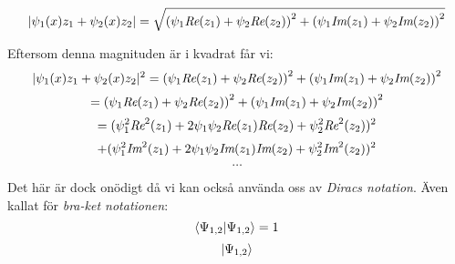 \documentclass{article}
\begin{document}
$$
|\psi_1(x)z_1 + \psi_2(x)z_2| = \sqrt{ \left( \psi_1 \emph{Re}(z_1) + \psi_2 \emph{Re}(z_2) \right)^2 + \left( \psi_1 \emph{Im}(z_1) + \psi_2 \emph{Im}(z_2) \right)^2 }
$$

Eftersom denna magnituden är i kvadrat får vi:
$$
|\psi_1(x)z_1 + \psi_2(x)z_2|^2 = \left( \psi_1 \emph{Re}(z_1) + \psi_2 \emph{Re}(z_2) \right)^2 + \left( \psi_1 \emph{Im}(z_1) + \psi_2 \emph{Im}(z_2) \right)^2 
$$
$$
= \left( \psi_1 \emph{Re}(z_1) + \psi_2 \emph{Re}(z_2) \right)^2 + \left( \psi_1 \emph{Im}(z_1) + \psi_2 \emph{Im}(z_2) \right)^2 
$$
$$
= ( \psi_1^2 \emph{Re}^2(z_1) + 2\psi_1 \psi_2 \emph{Re}(z_1)\emph{Re}(z_2) + \psi_2^2 \emph{Re}^2(z_2) )^2 
$$
$$
+ ( \psi_1^2 \emph{Im}^2(z_1) + 2\psi_1 \psi_2 \emph{Im}(z_1)\emph{Im}(z_2) + \psi_2^2 \emph{Im}^2(z_2) )^2 
$$
$$
\dots
$$

Det här är dock onödigt då vi kan också använda oss av \emph{Diracs notation}. Även kallat för \emph{bra-ket notationen}:
$$
\braket{\Psi_{1,2}|\Psi_{1,2}} = 1
$$
$$
\ket{\Psi_{1,2}}
$$
\end{document}
